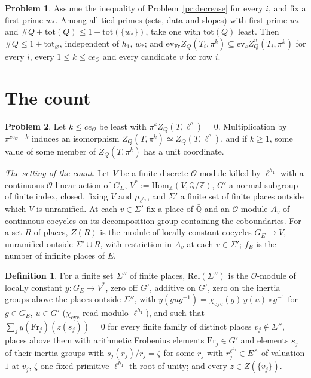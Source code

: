\documentclass[reqno]{amsart}
\theoremstyle{definition}
\newtheorem{problem}{Problem}[section]
\newtheorem{definition}{Definition}[section]
\theoremstyle{plain}
\newcommand{\Z}{\mathbb{Z}}
\newcommand{\Q}{\mathbb{Q}}
\newcommand{\Oc}{\mathcal{O}}
\newcommand{\Fr}{\mathrm{Fr}}
\newcommand{\ev}{\mathrm{ev}}
\newcommand{\Rel}{\mathrm{Rel}}
\newcommand{\tot}{\mathrm{tot}}
\newcommand{\cyc}{\chi_{\mathrm{cyc}}}
\begin{document}
\begin{problem}\label{pr:minimum}
Assume the inequality of Problem~\ref{pr:decrease} for every \(i\), and fix a first prime \(w_*\).  Among all tied primes (sets, data and slopes) with first prime \(w_*\) and \(\#Q + \tot(Q) \le 1 + \tot(\{w_*\})\), take one with \(\tot(Q)\) least.  Then \(\#Q \le 1 + \tot_\varnothing\), independent of \(h_1\), \(w_*\); and \(\ev_{\Fr} Z_Q(T_i, \pi^k) \subseteq \ev_s Z^v_Q(T_i, \pi^k)\) for every \(i\), every \(1 \le k \le ce_{\Oc}\) and every candidate \(v\) for row \(i\).
\end{problem}

\section{The count}\label{sec:count}

\begin{problem}\label{pr:primitive}
Let \(k \le ce_{\Oc}\) be least with \(\pi^k Z_Q(T, \ell^c) = 0\).  Multiplication by \(\pi^{ce_{\Oc} - k}\) induces an isomorphism \(Z_Q(T, \pi^k) \simeq Z_Q(T, \ell^c)\), and if \(k \ge 1\), some value of some member of \(Z_Q(T, \pi^k)\) has a unit coordinate.
\end{problem}

\emph{The setting of the count.}  Let \(V\) be a finite discrete \(\Oc\)-module killed by \(\ell^{h_1}\) with a continuous \(\Oc\)-linear action of \(G_E\), \(V^{*} := \mathrm{Hom}_{\Z}(V, \Q/\Z)\), \(G'\) a normal subgroup of finite index, closed, fixing \(V\) and \(\mu_{\ell^{h_1}}\), and \(\Sigma'\) a finite set of finite places outside which \(V\) is unramified.  At each \(v \in \Sigma'\) fix a place of \(\bar{\Q}\) and an \(\Oc\)-module \(A_v\) of continuous cocycles on its decomposition group containing the coboundaries.  For a set \(R\) of places, \(Z(R)\) is the module of locally constant cocycles \(G_E \to V\), unramified outside \(\Sigma' \cup R\), with restriction in \(A_v\) at each \(v \in \Sigma'\); \(f_E\) is the number of infinite places of \(E\).

\begin{definition}\label{def:relations}
For a finite set \(\Sigma''\) of finite places, \(\Rel(\Sigma'')\) is the \(\Oc\)-module of locally constant \(y \colon G_E \to V^{*}\), zero off \(G'\), additive on \(G'\), zero on the inertia groups above the places outside \(\Sigma''\), with \(y(gug^{-1}) = \cyc(g)\,y(u) \circ g^{-1}\) for \(g \in G_E\), \(u \in G'\) (\(\cyc\) read modulo \(\ell^{h_1}\)), and such that \(\sum_j y(\Fr_j)(z(s_j)) = 0\) for every finite family of distinct places \(v_j \notin \Sigma''\), places above them with arithmetic Frobenius elements \(\Fr_j \in G'\) and elements \(s_j\) of their inertia groups with \(s_j(r_j)/r_j = \zeta\) for some \(r_j\) with \(r_j^{\ell^{h_1}} \in E^\times\) of valuation \(1\) at \(v_j\), \(\zeta\) one fixed primitive \(\ell^{h_1}\)-th root of unity; and every \(z \in Z(\{v_j\})\).
\end{definition}
\end{document}
